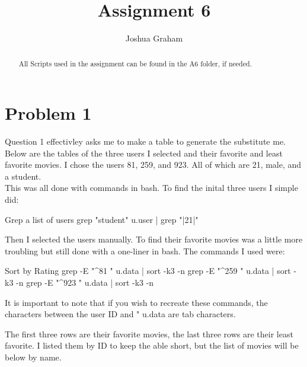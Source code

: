 \documentclass[11pt]{report}
\begin{document}
\title{Assignment 6}
\author{Joshua Graham}

\maketitle
\pagebreak
\begin{abstract}
All Scripts used in the assignment can be found in the A6 folder, if needed.

\end{abstract}
\section{Problem 1}
	Question 1 effectivley asks me to make a table to generate the substitute me. Below are the tables of the three users I selected and their favorite and least favorite movies. I chose the users 81, 259, and 923. All of which are 21, male, and a student. 
\\
This was all done with commands in bash. To find the inital three users I simple did:
\begin{mylisting}{Grep a list of users}
grep "student" u.user | grep "|21|"
\end{mylisting}
Then I selected the users manually. To find their favorite movies was a little more troubling but still done with a one-liner in bash. The commands I used were:
\begin{mylisting}{Sort by Rating}
grep -E "^81	" u.data | sort -k3 -n
grep -E "^259	" u.data | sort -k3 -n
grep -E "^923	" u.data | sort -k3 -n

\end{mylisting}
It is important to note that if you wish to recreate these commands, the characters between the user ID and " u.data are tab characters.

The first three rows are their favorite movies, the last three rows are their least favorite. I listed them by ID to keep the able short, but the list of movies will be below by name.
\end{document}
